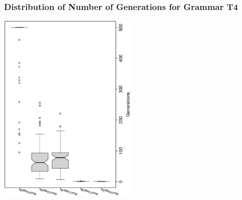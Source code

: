  \begin{frame}
 \frametitle{ Distribution of Number of Generations for Grammar T4 }
 \begin{center}
\includegraphics[width=0.5\textwidth, angle=-90]
{ExpBboxplottGenerations009.eps}
 \end{center}
 \label{ExpBboxplottGenerations009.eps}  
 \end{frame}

